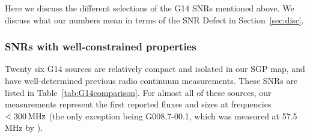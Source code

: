 \documentclass[useAMS,usenatbib]{mn2e}
\begin{document}
Here we discuss the different selections of the G14 SNRs mentioned above. We discuss what our numbers mean in terms of the SNR Defect in Section~\ref{sec:disc}.

\subsubsection{SNRs with well-constrained properties}

Twenty six G14 sources are relatively compact and isolated in our SGP map, and have well-determined previous radio continuum measurements. These SNRs are listed in Table~\ref{tab:G14comparison}. For almost all of these sources, our measurements represent the first reported fluxes and sizes at frequencies $<300\,{\rm MHz}$ (the only exception being G008.7-00.1, which was measured at 57.5\,MHz by \citealt{Odegard.86}).
\end{document}

